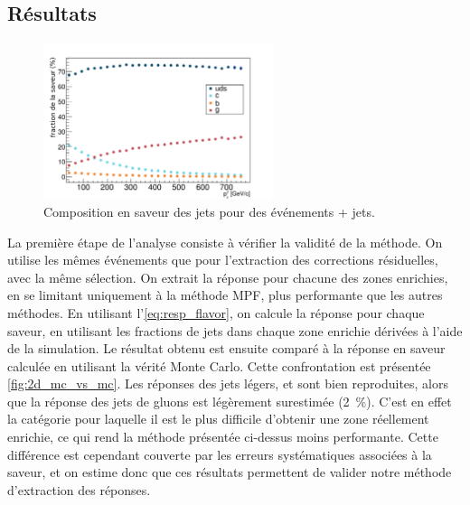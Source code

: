 \subsection{Résultats}

\begin{figure}[tbp]
  \centering
  \includegraphics[width=0.60\textwidth]{chapitre4/figs/flavor/gammajet_flavors.pdf}
  \caption{Composition en saveur des jets pour des événements \Pphoton + jets.}
  \label{fig:gjet_flavor}
\end{figure}

La première étape de l'analyse consiste à vérifier la validité de la méthode. On utilise les mêmes événements que pour l'extraction des corrections résiduelles, avec la même sélection. On extrait la réponse pour chacune des zones enrichies, en se limitant uniquement à la méthode MPF, plus performante que les autres méthodes. En utilisant l'\cref{eq:resp_flavor}, on calcule la réponse pour chaque saveur, en utilisant les fractions de jets dans chaque zone enrichie dérivées à l'aide de la simulation. Le résultat obtenu est ensuite comparé à la réponse en saveur calculée en utilisant la vérité Monte Carlo. Cette confrontation est présentée \cref{fig:2d_mc_vs_mc}. Les réponses des jets légers, \Pcharm et \Pbottom sont bien reproduites, alors que la réponse des jets de gluons est légèrement surestimée (\tilde \SI{2}{\%}). C'est en effet la catégorie pour laquelle il est le plus difficile d'obtenir une zone réellement enrichie, ce qui rend la méthode présentée ci-dessus moins performante. Cette différence est cependant couverte par les erreurs systématiques associées à la saveur, et on estime donc que ces résultats permettent de valider notre méthode d'extraction des réponses.

